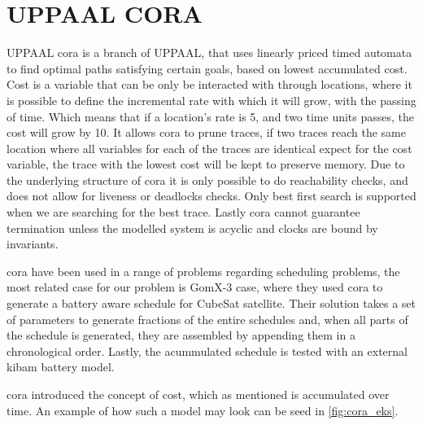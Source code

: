 \section{UPPAAL CORA}\label{sec:upp_cora}
UPPAAL \acrfull{cora} is a branch of UPPAAL, that uses linearly priced timed automata to find optimal paths satisfying certain goals, based on lowest accumulated cost\cite{cs_cora}. Cost is a variable that can be only be interacted with through locations, where it is possible to define the incremental rate with which it will grow, with the passing of time. 
Which means that if a location's rate is 5, and two time units passes, the cost will grow by 10. It allows \gls{cora} to prune traces, if two traces reach the same location where all variables for each of the traces are identical expect for the cost variable, the trace with the lowest cost will be kept to preserve memory. 
Due to the underlying structure of \gls{cora} it is only possible to do reachability checks, and does not allow for liveness or deadlocks checks.
Only best first search is supported when we are searching for the best trace. Lastly \gls{cora} cannot guarantee termination unless the modelled system is acyclic and clocks are bound by invariants.

\Gls{cora} have been used in a range of problems regarding scheduling problems, the most related case for our problem is GomX-3 case, where they used \gls{cora} to generate a battery aware schedule for CubeSat satellite. Their solution takes a set of parameters to generate fractions of the entire schedules and, when all parts of the schedule is generated, they are assembled by appending them in a chronological order. Lastly, the acummulated schedule is tested with an external \gls{kibam} battery model.

\Gls{cora} introduced the concept of cost, which as mentioned is accumulated over time. An example of how such a model may look can be seed in \cref{fig:cora_eks}.

